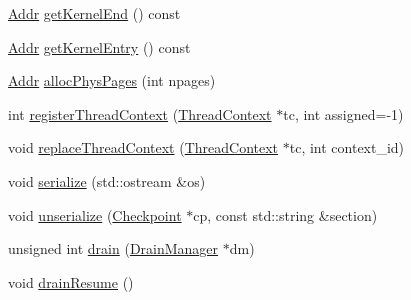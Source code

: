 \begin{DoxyCompactItemize}
\item 
\hyperlink{base_2types_8hh_af1bb03d6a4ee096394a6749f0a169232}{Addr} \hyperlink{classSystem_ab1fd157e4287a41711d83b7a48161c2b}{getKernelEnd} () const 
\item 
\hyperlink{base_2types_8hh_af1bb03d6a4ee096394a6749f0a169232}{Addr} \hyperlink{classSystem_a21bc77f01980debea40a75c23c9a7ae8}{getKernelEntry} () const 
\item 
\hyperlink{base_2types_8hh_af1bb03d6a4ee096394a6749f0a169232}{Addr} \hyperlink{classSystem_ab816e894891a147b8ba762d89f46c902}{allocPhysPages} (int npages)
\item 
int \hyperlink{classSystem_a7211419d4d2d396946880da898f5dbbf}{registerThreadContext} (\hyperlink{classThreadContext}{ThreadContext} $\ast$tc, int assigned=-\/1)
\item 
void \hyperlink{classSystem_ab2e74da826f1a39705880c80002f52fd}{replaceThreadContext} (\hyperlink{classThreadContext}{ThreadContext} $\ast$tc, int context\_\-id)
\item 
void \hyperlink{classSystem_a53e036786d17361be4c7320d39c99b84}{serialize} (std::ostream \&os)
\item 
void \hyperlink{classSystem_af22e5d6d660b97db37003ac61ac4ee49}{unserialize} (\hyperlink{classCheckpoint}{Checkpoint} $\ast$cp, const std::string \&section)
\item 
unsigned int \hyperlink{classSystem_aa8a18d230dba7a674ac8a0b4f35bc36a}{drain} (\hyperlink{classDrainManager}{DrainManager} $\ast$dm)
\item 
void \hyperlink{classSystem_a8f020d3237536fe007fc488c4125c5d8}{drainResume} ()
\end{DoxyCompactItemize}
